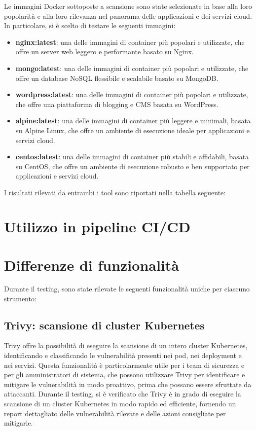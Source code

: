 Le immagini Docker sottoposte a scansione sono state selezionate in base alla loro popolarità e alla loro rilevanza nel panorama delle applicazioni e dei servizi cloud. In particolare, si è scelto di testare le seguenti immagini:
\begin{itemize}
   \item \textbf{nginx:latest}: una delle immagini di container più popolari e utilizzate, che offre un server web leggero e performante basato su Nginx.
   \item \textbf{mongo:latest}: una delle immagini di container più popolari e utilizzate, che offre un database NoSQL flessibile e scalabile basato su MongoDB.
   \item \textbf{wordpress:latest}: una delle immagini di container più popolari e utilizzate, che offre una piattaforma di blogging e CMS basata su WordPress.
   \item \textbf{alpine:latest}: una delle immagini di container più leggere e minimali, basata su Alpine Linux, che offre un ambiente di esecuzione ideale per applicazioni e servizi cloud.
   \item \textbf{centos:latest}: una delle immagini di container più stabili e affidabili, basata su CentOS, che offre un ambiente di esecuzione robusto e ben supportato per applicazioni e servizi cloud.
\end{itemize}
I risultati rilevati da entrambi i tool sono riportati nella tabella seguente:
\section{Utilizzo in pipeline CI/CD}

\section{Differenze di funzionalità}
Durante il testing, sono state rilevate le seguenti funzionalità uniche per ciascuno strumento:
\subsection{Trivy: scansione di cluster Kubernetes}
Trivy offre la possibilità di eseguire la scansione di un intero cluster Kubernetes, identificando e classificando le vulnerabilità presenti nei pod, nei deployment e nei servizi. Questa funzionalità è particolarmente utile per i team di sicurezza e per gli amministratori di sistema, che possono utilizzare Trivy per identificare e mitigare le vulnerabilità in modo proattivo, prima che possano essere sfruttate da attaccanti. Durante il testing, si è verificato che Trivy è in grado di eseguire la scansione di un cluster Kubernetes in modo rapido ed efficiente, fornendo un report dettagliato delle vulnerabilità rilevate e delle azioni consigliate per mitigarle.
